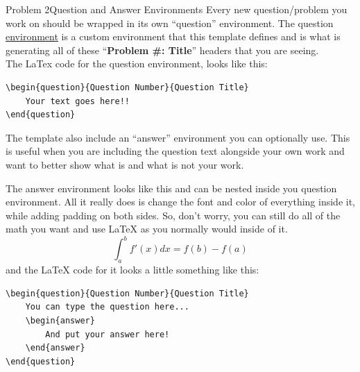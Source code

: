 \documentclass[11pt]{article}
\begin{document}
\begin{question}{Problem 2}{Question and Answer Environments}
  Every new question/problem you work on should be wrapped in its own
  ``question'' environment. The question
  \href{https://www.sharelatex.com/learn/Environments}{environment} is a custom
  environment that this template defines and is what is generating all of these
  ``{\bf{Problem \#: Title}}'' headers that you are seeing.\\

  The LaTex code for the question environment, looks like this:\\
  \begin{verbatim} 
\begin{question}{Question Number}{Question Title}
    Your text goes here!!
\end{question}
\end{verbatim}

The template also include an ``answer'' environment you can optionally use. This
is useful when you are including the question text alongside your own work and
want to better show what is and what is not your work.
\begin{answer}
  The answer environment looks like this and can be nested inside you question
  environment. All it really does is change the font and color of everything
  inside it, while adding padding on both sides. So, don't worry, you can still
  do all of the math you want and use LaTeX as you normally would inside of it.
  \begin{equation}
    \int_a^b f'(x)dx = f(b) -f(a)
  \end{equation}
  and the LaTeX code for it looks a little something like this:
  \begin{verbatim}
\begin{question}{Question Number}{Question Title}
    You can type the question here...
    \begin{answer}
        And put your answer here!
    \end{answer}
\end{question}
\end{verbatim}
  
\end{answer}
\end{question}
\end{document}
